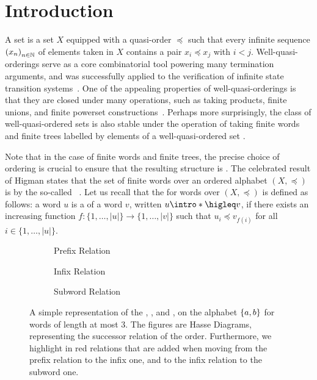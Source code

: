 \section{Introduction}
\label{introduction:sec}

\AP A  set is a set $X$ equipped with a quasi-order
$\preceq$ such that every infinite sequence $\seqof{x_n}$ of elements taken in
$X$ contains a pair $x_i \preceq x_j$ with $i < j$. Well-quasi-orderings serve
as a core combinatorial tool powering many termination arguments, and was
successfully applied to the verification of infinite state transition
systems~\cite{ABDU96,ABDU98}. One of the appealing properties of
well-quasi-orderings is that they are closed under many operations, such as
taking products, finite unions, and finite powerset
constructions~\cite{SCSC12}. Perhaps more surprisingly, the class of
well-quasi-ordered sets is also stable under the operation of taking finite
words and finite trees labelled by elements of a well-quasi-ordered set
\cite{HIG52,KRU72}.

\AP Note that in the case of finite words and finite trees, the precise choice
of ordering is crucial to ensure that the resulting structure is
. The celebrated result of Higman states that the set of
finite words over an ordered alphabet $(X, \preceq)$ is 
by the so-called ~\cite{HIG52}. Let us recall
that the  for words over $(X, \preceq)$ is defined as
follows: a word $u$ is a  of a word $v$, written $u
\intro*\higleq v$, if there exists an increasing function $f \colon \{1,
\ldots, |u|\} \to \{1, \ldots, |v|\}$ such that $u_i \preceq v_{f(i)}$ for all
$i \in \{1, \ldots, |u|\}$.

\begin{figure}
    \centering
    \begin{subfigure}[t]{0.48\textwidth}
    	\centering
    	
    	\caption{Prefix Relation}
   	\end{subfigure}%
   	\hfill%
   	\begin{subfigure}[t]{0.48\textwidth}
   		\centering
   		
   		\caption{Infix Relation}
   	\end{subfigure}
   	\begin{subfigure}[t]{0.48\textwidth}
   		\centering
   		
   		\caption{Subword Relation}
   	\end{subfigure}
   	
   	\caption{A simple representation of the ,
        ,
        and ,
        on the alphabet $\{ a,b \}$ for words of
        length at most $3$. The figures are Hasse Diagrams,
        representing the successor relation of the order.
        Furthermore, we highlight in red relations that are added
        when moving from the prefix relation to the infix one,
        and to the infix relation to the subword one.}
    \label{word-embeddings:fig}
\end{figure}


